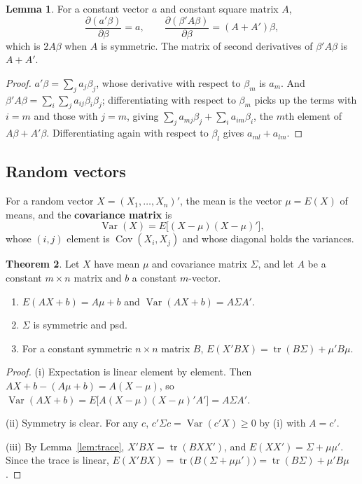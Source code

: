 \documentclass[11pt,a4paper]{article}
\numberwithin{equation}{section}
\DeclareMathOperator{\Var}{Var}
\DeclareMathOperator{\Cov}{Cov}
\DeclareMathOperator{\tr}{tr}
\theoremstyle{definition}
\newtheorem{thm}{Theorem}[subsection]
\newtheorem{lem}[thm]{Lemma}
\begin{document}
\begin{lem}
\label{lem:deriv}
For a constant vector $a$ and constant square matrix $A$,
\[
\frac{\partial(a'\beta)}{\partial\beta} = a, \qquad \frac{\partial(\beta'A\beta)}{\partial\beta} = (A + A')\beta ,
\]
which is $2A\beta$ when $A$ is symmetric. The matrix of second derivatives of $\beta'A\beta$ is $A + A'$.
\end{lem}

\begin{proof}
$a'\beta = \sum_j a_j\beta_j$, whose derivative with respect to $\beta_m$ is $a_m$. And $\beta'A\beta = \sum_i\sum_j a_{ij}\beta_i\beta_j$; differentiating with respect to
$\beta_m$ picks up the terms with $i = m$ and those with $j = m$, giving $\sum_j a_{mj}\beta_j + \sum_i a_{im}\beta_i$, the $m$th element of
$A\beta + A'\beta$. Differentiating again with respect to $\beta_l$ gives $a_{ml} + a_{lm}$.
\end{proof}

\subsection{Random vectors}
\label{ssec:randvec}

For a random vector $X = (X_1, \dots, X_n)'$, the mean is the vector $\mu = E(X)$ of means, and the \textbf{covariance matrix} is
\[
\Var(X) = E\bigl[(X - \mu)(X - \mu)'\bigr],
\]
whose $(i, j)$ element is $\Cov(X_i, X_j)$ and whose diagonal holds the variances.

\begin{thm}
\label{thm:linvec}
Let $X$ have mean $\mu$ and covariance matrix $\Sigma$, and let $A$ be a constant $m \times n$ matrix and $b$ a constant $m$-vector.
\begin{enumerate}[label=(\roman*)]
\item $E(AX + b) = A\mu + b$ and $\Var(AX + b) = A\Sigma A'$.
\item $\Sigma$ is symmetric and psd.
\item For a constant symmetric $n \times n$ matrix $B$, $E(X'BX) = \tr(B\Sigma) + \mu'B\mu$.
\end{enumerate}
\end{thm}

\begin{proof}
(i) Expectation is linear element by element. Then $AX + b - (A\mu + b) = A(X - \mu)$, so
$\Var(AX + b) = E\bigl[A(X - \mu)(X - \mu)'A'\bigr] = A\Sigma A'$.

(ii) Symmetry is clear. For any $c$, $c'\Sigma c = \Var(c'X) \geq 0$ by (i) with $A = c'$.

(iii) By Lemma~\ref{lem:trace}, $X'BX = \tr(BXX')$, and $E(XX') = \Sigma + \mu\mu'$. Since the trace is linear,
$E(X'BX) = \tr\bigl(B(\Sigma + \mu\mu')\bigr) = \tr(B\Sigma) + \mu'B\mu$.
\end{proof}
\end{document}
